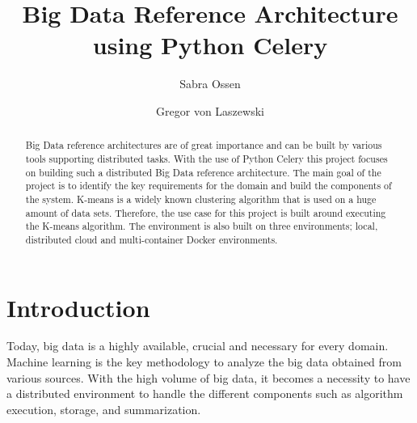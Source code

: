 
\title{Big Data Reference Architecture using Python Celery}


\author{Sabra Ossen}

\author{Gregor von Laszewski}


\renewcommand{\shortauthors}{G. v. Laszewski}


\begin{abstract}
Big Data reference architectures are of great importance and can be built by 
various tools supporting distributed tasks. With the use of Python Celery this 
project focuses on building such a distributed Big Data reference 
architecture. The main goal of the project is to identify the key requirements 
for the domain and build the components of the system. K-means is a widely 
known clustering algorithm that is used on a huge amount of data sets. 
Therefore, the use case for this project is built around executing the K-means 
algorithm. The environment is also built on three environments; local, 
distributed cloud and multi-container Docker environments.
\end{abstract}



\maketitle

\section{Introduction}

Today, big data is a highly available, crucial and necessary for every domain. 
Machine learning is the key methodology to analyze the big data obtained from 
various sources. With the high volume of big data, it becomes a necessity to 
have a distributed environment to handle the different components such as 
algorithm execution, storage, and summarization. 

